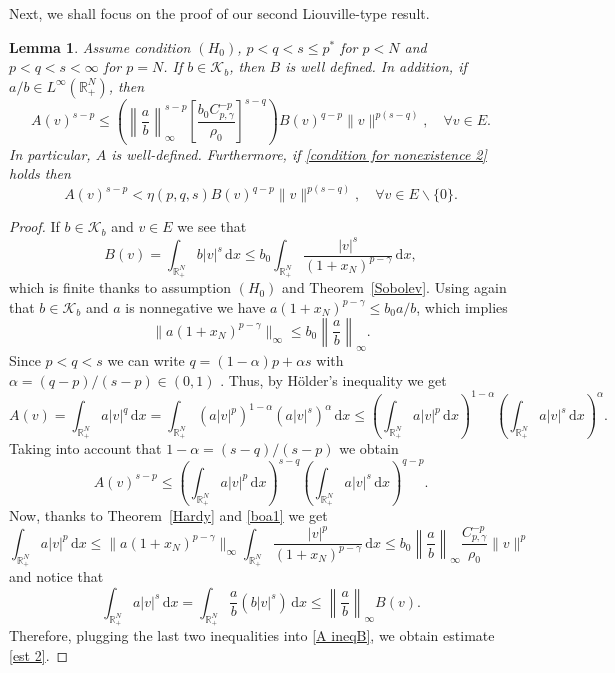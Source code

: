 \documentclass[12pt,reqno]{amsart}
\newtheorem{lemma}[theorem]{Lemma}
\begin{document}
		Next, we shall focus on the proof of our second Liouville-type result.
 \begin{lemma}\label{Estimativa 2} Assume condition $(H_0)$, $p<q<s\leq p^*$ for $p<N$ and $p<q<s< \infty$ for $p=N$. If $b\in\mathcal{K}_b$, then $B$ is well defined. In addition, if $a/b\in L^{\infty}(\mathds{R}^N_+)$, then 
		\begin{equation}\label{est 2}
			A(v)^{s-p}\leq \left(\left\|\frac{a}{b}\right\|_{\infty}^{s-p}	\left[\frac{b_0C_{p,\gamma}^{-p}}{\rho_0}\right]^{s-q}\right)B(v)^{q-p}\|v\|^{p(s-q)}, \quad \forall v \in E.
		\end{equation}
		In particular, $A$ is well-defined. Furthermore, if \eqref{condition for nonexistence 2} holds then  
		\begin{equation}\label{Estima3}
			A(v)^{s-p}<\eta(p,q,s) B(v)^{q-p}\|v\|^{p(s-q)},  \quad \forall v \in E\backslash\{0\}.
		\end{equation}
	\end{lemma}
\begin{proof} If $b\in \mathcal{K}_b$ and $v\in E$ we see that 
 $$
B(v)=\int_{\mathds{R}^{N}_+} b|v|^s\, \mathrm{d} x\leq b_0\int_{\mathds{R}^{N}_+}\frac{|v|^s}{(1+x_N)^{p-\gamma}}\, \mathrm{d} x,
$$
which is finite thanks to assumption $(H_0)$ and Theorem~\ref{Sobolev}. Using again that $b\in\mathcal{K}_b$ and $a$ is nonnegative we have
 $a(1+x_N)^{p-\gamma}\leq b_0a/b$, which implies 
 $$
 \|a(1+x_N)^{p-\gamma}\|_\infty\leq b_0\left\|\frac{a}{b}\right\|_\infty.
 $$
 Since $p<q<s$ we can write $q=(1-\alpha)p+\alpha s$ with $\alpha=(q-p)/(s-p)\in (0,1)$ . Thus, by H\"{o}lder's inequality we get 
		\[
A(v)=\int_{\mathds{R}^{N}_+}a|v|^q\, \mathrm{d} x=\int_{\mathds{R}^{N}_+} (a|v|^p)^{1-\alpha}(a|v|^s)^\alpha \, \mathrm{d} x\leq \left(\int_{\mathds{R}^{N}_+}a|v|^p\, \mathrm{d} x\right)^{1-\alpha}\left(\int_{\mathds{R}^{N}_+} a|v|^s\, \mathrm{d} x\right)^{\alpha}.
		\]
Taking into account that $1-\alpha=(s-q)/(s-p)$ we obtain
\begin{equation}\label{A ineqB}
			A(v)^{s-p}\leq \left(\int_{\mathds{R}^{N}_+}a|v|^p\, \mathrm{d} x\right)^{s-q}\left(\int_{\mathds{R}^{N}_+} a|v|^s\, \mathrm{d} x\right)^{q-p}.
   \end{equation}
   Now, thanks to Theorem~\ref{Hardy} and \eqref{boa1} we get 
   $$
   \int_{\mathds{R}^{N}_+} a|v|^p\, \mathrm{d} x\leq\|a(1+x_N)^{p-\gamma}\|_\infty\int_{\mathds{R}^{N}_+}\frac{|v|^p}{(1+x_N)^{p-\gamma}}\, \mathrm{d} x\leq b_0\left\|\frac{a}{b}\right\|_\infty \frac{C^{-p}_{p,\gamma}}{\rho_0}\|v\|^p
   $$
   and notice that 
   $$
   \int_{\mathds{R}^{N}_+} a|v|^s\, \mathrm{d} x=\int_{\mathds{R}^{N}_+} \frac{a}{b}\left(b|v|^s\right)\, \mathrm{d} x\leq\left\|\frac{a}{b}\right\|_\infty B(v).
   $$
Therefore, plugging the last two inequalities into \eqref{A ineqB}, we obtain estimate \eqref{est 2}.
\end{proof}
	
\end{document}

